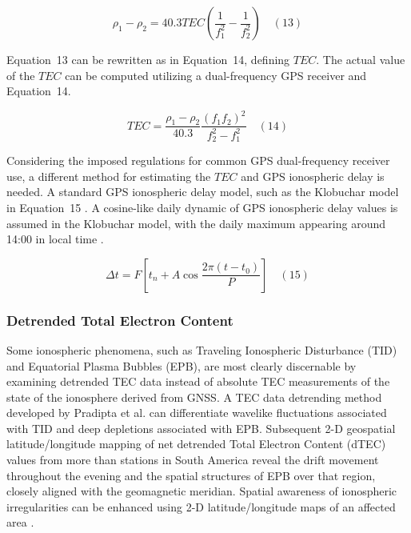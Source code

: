 \documentclass[sn-mathphys-num]{sn-jnl}%
\begin{document}
\begin{equation}
	\rho_{1} - \rho_{2} = 40.3 TEC \left( \frac{1}{f_{1}^{2}} - \frac{1}{f_{2}^{2}} \right)
	\quad\left(13\right)
\end{equation}

Equation~13 can be rewritten as in Equation~14, defining $TEC$. The actual value of the $TEC$ can be computed utilizing a dual-frequency GPS receiver and Equation~14.

\begin{equation}
	TEC = \frac{\rho_{1} - \rho_{2}}{40.3} \frac{{\left(f_{1}f_{2}\right)}^{2}}{f_{2}^{2}-f_{1}^{2}}
	\quad\left(14\right)
\end{equation}

Considering the imposed regulations for common GPS dual-frequency receiver use, a different method for estimating the $TEC$ and GPS ionospheric delay is needed. A standard GPS ionospheric delay model, such as the Klobuchar model in Equation~15 \cite{enge1994global,spilker1996global}. A cosine-like daily dynamic of GPS ionospheric delay values is assumed in the Klobuchar model, with the daily maximum appearing around 14:00 in local time \cite{klobuchar1987ionospheric}.

\begin{equation}
	\Delta t = F \left[ t_{n} + A \cos \frac{2\pi\left(t-t_{0}\right)}{P} \right]
	\quad\left(15\right)
\end{equation}

\subsubsection{Detrended Total Electron Content}

Some ionospheric phenomena, such as Traveling Ionospheric Disturbance (TID) and Equatorial Plasma Bubbles (EPB), are most clearly discernable by examining detrended TEC data instead of absolute TEC measurements of the state of the ionosphere derived from GNSS. A TEC data detrending method developed by Pradipta et al. \cite{Pradipta2015} can differentiate wavelike fluctuations associated with TID and deep depletions associated with EPB. Subsequent 2-D geospatial latitude/longitude mapping of net detrended Total Electron Content (dTEC) values from more than stations in South America reveal the drift movement throughout the evening and the spatial structures of EPB over that region, closely aligned with the geomagnetic meridian. Spatial awareness of ionospheric irregularities can be enhanced using 2-D latitude/longitude maps of an affected area \cite{Pradipta2019}.
\end{document}
